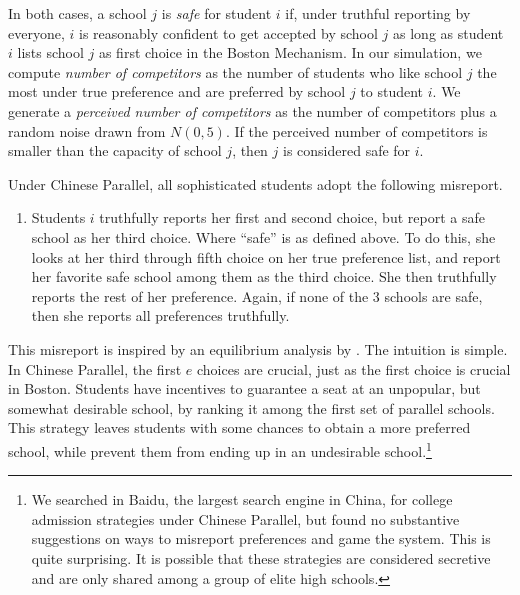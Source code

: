 \documentclass[10pt, reqno]{amsart}
\begin{document}
In both cases, a school $j$ is \textit{safe} for student $i$ if, under truthful reporting by everyone, $i$ is reasonably confident to get accepted by school $j$ as long as student $i$ lists school $j$ as first choice in the Boston Mechanism. In our simulation, we compute \textit{number of competitors} as the number of students who like school $j$ the most under true preference and are preferred by school $j$ to student $i$. We generate a \textit{perceived number of competitors} as the number of competitors plus a random noise drawn from $N(0,5)$. If the perceived number of competitors is smaller than the capacity of school $j$, then $j$ is considered safe for $i$. 

Under Chinese Parallel, all sophisticated students adopt the following misreport. 
\begin{enumerate}
	\item Students $i$ truthfully reports her first and second choice, but report a safe school as her third choice. Where ``safe'' is as defined above. To do this, she looks at her third through fifth choice on her true preference list, and report her favorite safe school among them as the third choice. She then truthfully reports the rest of her preference. Again, if none of the 3 schools are safe, then she reports all preferences truthfully. 
\end{enumerate}

This misreport is inspired by an equilibrium analysis by \citep{chen2013boston}. The intuition is simple. In Chinese Parallel, the first $e$ choices are crucial, just as the first choice is crucial in Boston. Students have incentives to guarantee a seat at an unpopular, but somewhat desirable school, by ranking it among the first set of parallel schools. This strategy leaves students with some chances to obtain a more preferred school, while prevent them from ending up in an undesirable school.\footnote{We searched in Baidu, the largest search engine in China, for college admission strategies under Chinese Parallel, but found no substantive suggestions on ways to misreport preferences and game the system. This is quite surprising. It is possible that these strategies are considered secretive and are only shared among a group of elite high schools.} 
\end{document}
